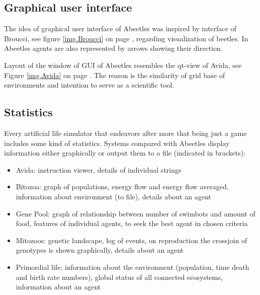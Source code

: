 \documentclass[a4paper,12pt]{report}
\begin{document}
\subsection {Graphical user interface}
The idea of graphical user interface of Abeetles was inspired by interface of Broucci, see figure \ref{img.Broucci} on page \pageref{img.Broucci}, regarding visualization of beetles. In Abeetles agents are also represented by arrows showing their direction. %

Layout of the window of GUI of Abeetles resembles the qt-view of Avida,  see Figure \ref{img.Avida} on page \pageref{img.Avida} . The reason is the similarity of grid base of environments and intention to serve as a scientific tool.

 
\subsection {Statistics}

Every artificial life simulator that endeavors after more that being just a game includes some kind of statistics. 
Systems compared with Abeetles display information either graphically or output them to a file (indicated in brackets):

\begin{itemize}
\item Avida: instruction viewer, details of individual strings 
\item Bitozoa: graph of populations, energy flow and energy flow averaged, information about environment (to file), details about an agent
 \item Gene Pool: graph of relationship between number of swimbots and amount of food, features of individual agents, to seek the best agent in chosen criteria
\item Mitozoos: genetic landscape, log of events, on reproduction the crossjoin of genotypes is shown graphically, details about an agent
\item Primordial life: information about the environment (population, time death and birth rate numbers), global status of all connected ecosystems, information about an agent
\end {itemize}

\end{document}
